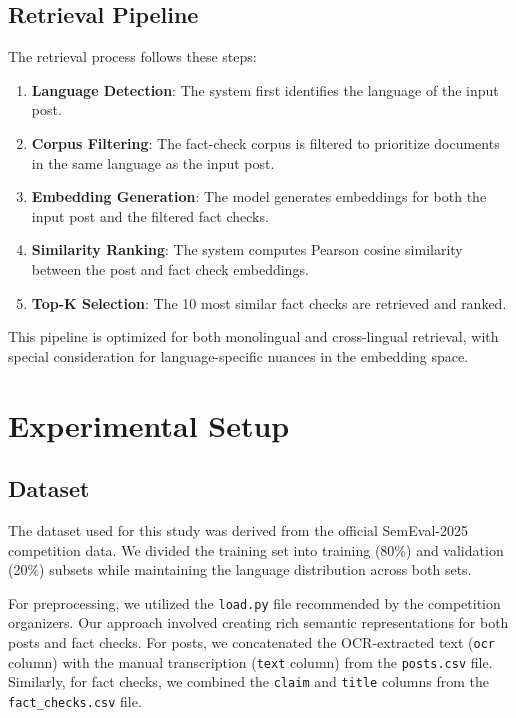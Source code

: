 \documentclass[11pt]{article}
\begin{document}
\subsection{Retrieval Pipeline}

The retrieval process follows these steps:

\begin{enumerate}
    \item \textbf{Language Detection}: The system first identifies the language of the input post.
    \item \textbf{Corpus Filtering}: The fact-check corpus is filtered to prioritize documents in the same language as the input post.
    \item \textbf{Embedding Generation}: The model generates embeddings for both the input post and the filtered fact checks.
    \item \textbf{Similarity Ranking}: The system computes Pearson cosine similarity between the post and fact check embeddings.
    \item \textbf{Top-K Selection}: The 10 most similar fact checks are retrieved and ranked.
\end{enumerate}

This pipeline is optimized for both monolingual and cross-lingual retrieval, with special consideration for language-specific nuances in the embedding space.

\section{Experimental Setup}

\subsection{Dataset}

The dataset used for this study was derived from the official SemEval-2025 competition data. We divided the training set into training (80\%) and validation (20\%) subsets while maintaining the language distribution across both sets.

For preprocessing, we utilized the \texttt{load.py} file recommended by the competition organizers. Our approach involved creating rich semantic representations for both posts and fact checks. For posts, we concatenated the OCR-extracted text (\texttt{ocr} column) with the manual transcription (\texttt{text} column) from the \texttt{posts.csv} file. Similarly, for fact checks, we combined the \texttt{claim} and \texttt{title} columns from the \texttt{fact\_checks.csv} file.
\end{document}
